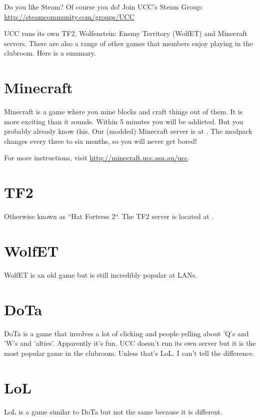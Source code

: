 \label{Games}

Do you like Steam? Of course you do! Join UCC's Steam Group: \url{http://steamcommunity.com/groups/UCC}

\noindent UCC runs its own TF2, Wolfenstein: Enemy Territory (WolfET) and Minecraft servers.
There are also a range of other games that members enjoy playing in the clubroom. Here is a summary.

\section{Minecraft}

Minecraft is a game where you mine blocks and craft things out of them. It is more exciting than it sounds. Within 5 minutes you will be addicted. But you probably already know this. 
Our (modded) Minecraft server is at . The modpack changes every three to six months, so you will never get bored!

For more instructions, visit \url{http://minecraft.ucc.asn.au/ucc}.

\section{TF2}

Otherwise known as ``Hat Fortress 2``. The TF2 server is located at .


\section{WolfET}

WolfET is an old game but is still incredibly popular at LANs.

\section{DoTa}

DoTa is a game that involves a lot of clicking and people yelling about 'Q's and 'W's and 'alties'. Apparently it's fun. UCC doesn't run its own server but it is the most popular game in the clubroom. Unless that's LoL. I can't tell the difference.

\section{LoL}

LoL is a game similar to DoTa but not the same because it is different.
